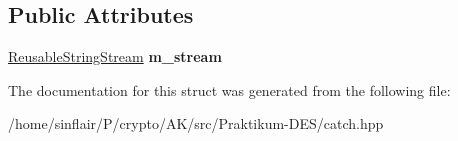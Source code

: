 \subsection*{Public Attributes}
\begin{DoxyCompactItemize}
\item 
\mbox{\label{structCatch_1_1MessageStream_a9202520faed8882ef469db9f353ec578}} 
\hyperlink{classCatch_1_1ReusableStringStream}{Reusable\+String\+Stream} {\bfseries m\+\_\+stream}
\end{DoxyCompactItemize}


The documentation for this struct was generated from the following file\+:\begin{DoxyCompactItemize}
\item 
/home/sinflair/\+P/crypto/\+A\+K/src/\+Praktikum-\/\+D\+E\+S/catch.\+hpp\end{DoxyCompactItemize}
